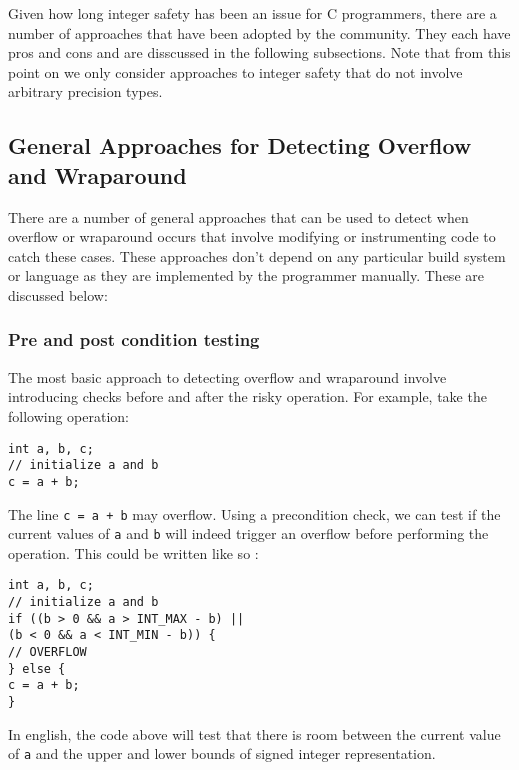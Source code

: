 Given how long integer safety has been an issue for C programmers, there are a number of approaches that have been adopted by the community. They each have pros and cons and are disscussed in the following subsections. Note that from this point on we only consider approaches to integer safety that do not involve arbitrary precision types.

\subsection{General Approaches for Detecting Overflow and Wraparound}

There are a number of general approaches that can be used to detect when overflow or wraparound occurs that involve modifying or instrumenting code to catch these cases. These approaches don't depend on any particular build system or language as they are implemented by the programmer manually. These are discussed below:

\subsubsection{Pre and post condition testing}
The most basic approach to detecting overflow and wraparound involve introducing checks before and after the risky operation. For example, take the following operation:

\begin{center}
\parbox{0.9\linewidth}{
\texttt{int a, b, c;\\
// initialize a and b\\
c = a + b;}
}
\end{center}

The line \texttt{c = a + b} may overflow. Using a precondition check, we can test if the current values of \texttt{a} and \texttt{b} will indeed trigger an overflow before performing the operation. This could be written like so \cite{secure_coding}:

\begin{center}
\parbox{0.9\linewidth}{
\texttt{int a, b, c;\\
// initialize a and b\\
if ((b > 0 \&\& a > INT\_MAX - b) ||\\
\hspace*{2em}(b < 0 \&\& a < INT\_MIN - b)) \{\\
\hspace*{1.5em}// OVERFLOW\\
\} else \{\\
\hspace*{1.5em}c = a + b;\\
\}}
}
\end{center}
In english, the code above will test that there is room between the current value of \texttt{a} and the upper and lower bounds of signed integer representation.

